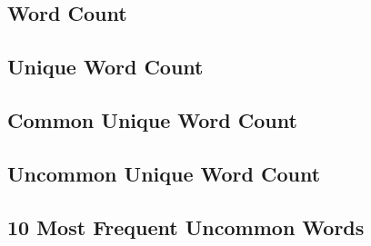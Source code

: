 \subsection{Word Count}
\begin{adjustbox}{max width=\textwidth}
\end{adjustbox}

\subsection{Unique Word Count}
\begin{adjustbox}{max width=\textwidth}
\end{adjustbox}

\subsection{Common Unique Word Count}
\begin{adjustbox}{max width=\textwidth}
\end{adjustbox}

\subsection{Uncommon Unique Word Count}
\begin{adjustbox}{max width=\textwidth}
\end{adjustbox}

\subsection{10 Most Frequent Uncommon Words}
\begin{adjustbox}{max width=\textwidth}
\end{adjustbox}

